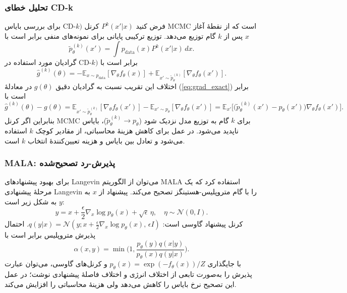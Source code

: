 \subsubsection{تحلیل خطای CD-k}
برای بررسی بایاس CD-\(k)\) فرض کنید \(P^k(x'|x)\) کرنل MCMC است که از نقطهٔ آغاز \(x\) پس از \(k\) گام توزیع می‌دهد. توزیع ترکیبی پایانی برای نمونه‌های منفی برابر است با
\begin{equation}
\tilde p^{(k)}_{\theta}(x') = \int p_{\text{data}}(x) P^k(x'|x)\,dx.
\end{equation}
گرادیان مورد استفاده در CD-\(k)\) برابر است با
\begin{equation}
\hat g^{(k)}(\theta) = -\mathbb{E}_{x\sim p_{\text{data}}}[\nabla_{\theta} f_{\theta}(x)] + \mathbb{E}_{x'\sim \tilde p^{(k)}_{\theta}}[\nabla_{\theta} f_{\theta}(x')].
\end{equation}
اختلاف این تقریب نسبت به گرادیان دقیق \(g(\theta)\) در معادلهٔ (\ref{eq:grad_exact}) برابر است با
\begin{equation}
\hat g^{(k)}(\theta) - g(\theta) = \mathbb{E}_{x'\sim \tilde p^{(k)}_{\theta}}[\nabla_{\theta} f_{\theta}(x')] - \mathbb{E}_{x'\sim p_{\theta}}[\nabla_{\theta} f_{\theta}(x')]
= \mathbb{E}_{x'}\big[\big(\tilde p^{(k)}_{\theta}(x') - p_{\theta}(x')\big)\nabla_{\theta} f_{\theta}(x')\big].
\end{equation}
بنابراین اگر کرنل MCMC برای \(k\) گام به توزیع مدل نزدیک شود (\(\tilde p^{(k)}_{\theta} \to p_{\theta}\))، بایاس ناپدید می‌شود. در عمل برای کاهش هزینهٔ محاسباتی، از مقادیر کوچک \(k\) استفاده می‌شود و تعادل بین بایاس و هزینه تعیین‌کنندهٔ انتخاب \(k\) است.

\subsubsection{MALA: پذیرش-رد تصحیح‌شده}
برای بهبود پیشنهادهای Langevin می‌توان از الگوریتم MALA استفاده کرد که یک مرحلهٔ پیشنهادی Langevin را با گام متروپلیس-هستینگز تصحیح می‌کند. پیشنهاد از \(x\) به \(y\) به شکل زیر است:
\begin{equation}
y = x + \frac{\epsilon}{2} \nabla_x \log p_{\theta}(x) + \sqrt{\epsilon}\,\eta, \quad \eta\sim\mathcal{N}(0,I).
\end{equation}
کرنل پیشنهاد گاوسی است: \(q(y|x)=\mathcal{N}(y; x + \frac{\epsilon}{2}\nabla_x \log p_{\theta}(x),\,\epsilon I)\). احتمال پذیرش متروپلیس برابر است با
\begin{equation}
\alpha(x,y)=\min\Big(1, \frac{p_{\theta}(y)q(x|y)}{p_{\theta}(x)q(y|x)}\Big).
\end{equation}
با جایگذاری \(p_{\theta}(x)=\exp(-f_{\theta}(x))/Z\) و کرنل‌های گاوسی، می‌توان عبارت پذیرش را به‌صورت تابعی از اختلاف انرژی و اختلاف فاصلهٔ پیشنهادی نوشت؛ در عمل این تصحیح نرخ بایاس را کاهش می‌دهد ولی هزینهٔ محاسباتی را افزایش می‌کند.

